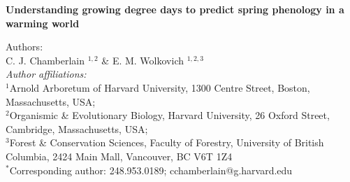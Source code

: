 \documentclass{article}\usepackage[]{graphicx}\usepackage[]{color}
\makeatletter
\newenvironment{kframe}{%
 \def\at@end@of@kframe{}%
 \ifinner\ifhmode%
  \def\at@end@of@kframe{\end{minipage}}%
  \begin{minipage}{\columnwidth}%
 \fi\fi%
 \def\FrameCommand##1{\hskip\@totalleftmargin \hskip-\fboxsep
 \colorbox{shadecolor}{##1}\hskip-\fboxsep
     \hskip-\linewidth \hskip-\@totalleftmargin \hskip\columnwidth}%
 \MakeFramed {\advance\hsize-\width
   \@totalleftmargin\z@ \linewidth\hsize
   \@setminipage}}%
 {\par\unskip\endMakeFramed%
 \at@end@of@kframe}
\makeatother
\begin{document}
\noindent\textbf{\Large{Understanding growing degree days to predict spring phenology in a warming world}}

\noindent Authors:\\
C. J. Chamberlain $^{1,2}$ \& E. M. Wolkovich $^{1,2,3}$
\vspace{2ex}\\
\emph{Author affiliations:}\\
$^{1}$Arnold Arboretum of Harvard University, 1300 Centre Street, Boston, Massachusetts, USA; \\
$^{2}$Organismic \& Evolutionary Biology, Harvard University, 26 Oxford Street, Cambridge, Massachusetts, USA; \\
$^{3}$Forest \& Conservation Sciences, Faculty of Forestry, University of British Columbia, 2424 Main Mall, Vancouver, BC V6T 1Z4\\
\vspace{2ex}
$^*$Corresponding author: 248.953.0189; cchamberlain@g.harvard.edu\\

\renewcommand{\thetable}{\arabic{table}}
\renewcommand{\thefigure}{\arabic{figure}}
\renewcommand{\labelitemi}{$-$}

\begin{kframe}


{\ttfamily\noindent\bfseries{}}\end{kframe}
\end{document}
